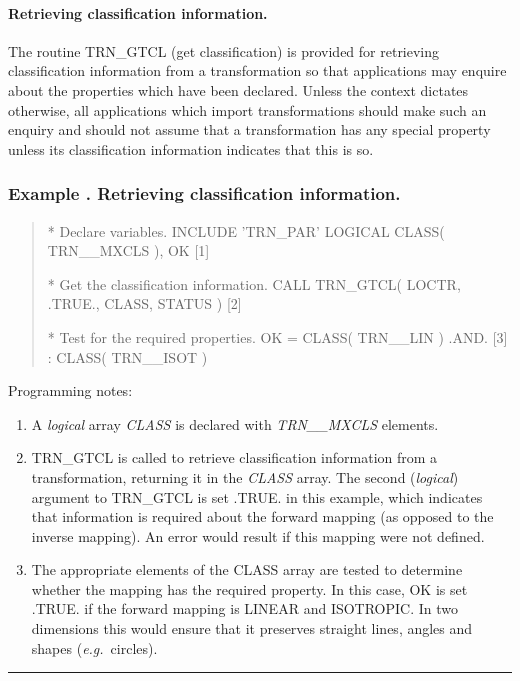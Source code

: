 \documentclass[twoside,nolof,11pt]{starlink}
\providecommand{\name}[1]{\small{#1}}
\providecommand{\fortvar}[1]{\emph{#1}}
\newcounter{examplecounter}
\providecommand{\example}[1]{\addtocounter{examplecounter}{1}
                         \subsubsection*{Example \theexamplecounter. #1}}
\providecommand{\exampledone}[0]{\begin{center} \rule{6em}{0.2mm} \end{center}}
\begin{document}
\paragraph{Retrieving classification information.}
The routine \name{TRN\_GTCL} (get classification) is provided for retrieving
classification information from a transformation so that applications may
enquire about the properties which have been declared.
Unless the context dictates otherwise, all applications which import
transformations should make such an enquiry and should not assume that a
transformation has any special property unless its classification
information indicates that this is so.

\example{Retrieving classification information.}

\begin{quote}
\begin{terminalv}

*  Declare variables.
      INCLUDE 'TRN_PAR'
      LOGICAL CLASS( TRN__MXCLS ), OK                  [1]

*  Get the classification information.
      CALL TRN_GTCL( LOCTR, .TRUE., CLASS, STATUS )    [2]

*  Test for the required properties.
      OK = CLASS( TRN__LIN ) .AND.                     [3]
     :     CLASS( TRN__ISOT )

\end{terminalv}
\end{quote}

Programming notes:

\begin{enumerate}

\item A \emph{logical} array \fortvar{CLASS} is declared with
\fortvar{TRN\_\_MXCLS} elements.

\item \name{TRN\_GTCL} is called to retrieve classification information from
a transformation, returning it in the \fortvar{CLASS} array.
The second (\emph{logical}) argument to \name{TRN\_GTCL} is set \name{.TRUE.}
in this example, which indicates that information is required about the
forward mapping (as opposed to the inverse mapping).
An error would result if this mapping were not defined.

\item The appropriate elements of the \name{CLASS} array are tested to
determine whether the mapping has the required property.
In this case, \name{OK} is set \name{.TRUE.} if the forward mapping is
\name{LINEAR} and \name{ISOTROPIC}.
In two dimensions this would ensure that it preserves straight lines, angles
and shapes (\emph{e.g.}\ circles).

\end{enumerate}
\exampledone
\end{document}
